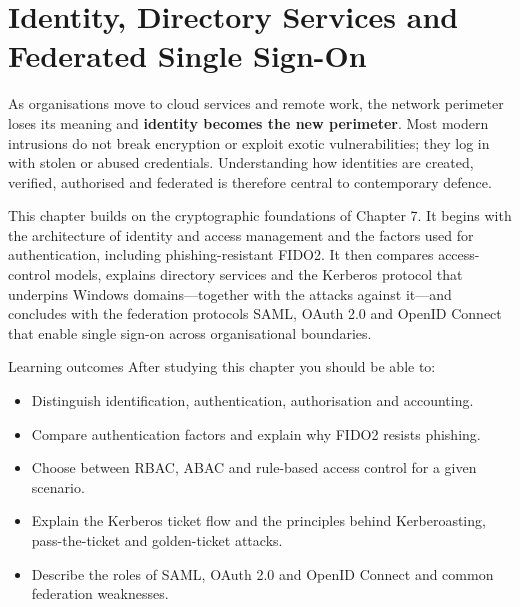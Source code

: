 \chapter{Identity, Directory Services and Federated Single Sign-On}\label{ch:8}

As organisations move to cloud services and remote work, the network perimeter loses its meaning and \textbf{identity becomes the new perimeter}. Most modern intrusions do not break encryption or exploit exotic vulnerabilities; they log in with stolen or abused credentials. Understanding how identities are created, verified, authorised and federated is therefore central to contemporary defence.

This chapter builds on the cryptographic foundations of Chapter 7. It begins with the architecture of identity and access management and the factors used for authentication, including phishing-resistant FIDO2. It then compares access-control models, explains directory services and the Kerberos protocol that underpins Windows domains—together with the attacks against it—and concludes with the federation protocols SAML, OAuth 2.0 and OpenID Connect that enable single sign-on across organisational boundaries.

\begin{outcomesbox}{Learning outcomes}
After studying this chapter you should be able to:
\begin{itemize}
  \item Distinguish identification, authentication, authorisation and accounting.
  \item Compare authentication factors and explain why FIDO2 resists phishing.
  \item Choose between RBAC, ABAC and rule-based access control for a given scenario.
  \item Explain the Kerberos ticket flow and the principles behind Kerberoasting, pass-the-ticket and golden-ticket attacks.
  \item Describe the roles of SAML, OAuth 2.0 and OpenID Connect and common federation weaknesses.
\end{itemize}
\end{outcomesbox}

